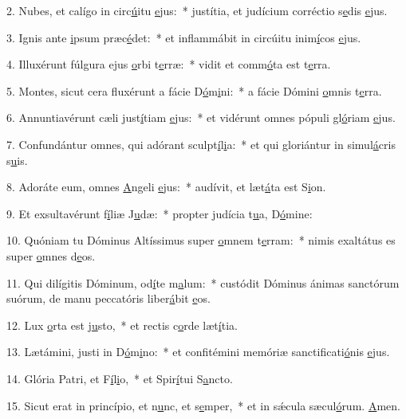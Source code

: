 2. Nubes, et calígo in circ\uline{ú}itu \uline{e}jus:~* justítia, et judícium corréctio s\uline{e}dis \uline{e}jus.\par 
3. Ignis ante \uline{i}psum præc\uline{é}det:~* et inflammábit in circúitu inim\uline{í}cos \uline{e}jus.\par 
4. Illuxérunt fúlgura ejus \uline{o}rbi t\uline{e}rræ:~* vidit et comm\uline{ó}ta est t\uline{e}rra.\par 
5. Montes, sicut cera fluxérunt a fácie D\uline{ó}m\uline{i}ni:~* a fácie Dómini \uline{o}mnis t\uline{e}rra.\par 
6. Annuntiavérunt cæli just\uline{í}tiam \uline{e}jus:~* et vidérunt omnes pópuli gl\uline{ó}riam \uline{e}jus.\par 
7. Confundántur omnes, qui adórant sculpt\uline{í}l\uline{i}a:~* et qui gloriántur in simul\uline{á}cris s\uline{u}is.\par 
8. Adoráte eum, omnes \uline{A}ngeli \uline{e}jus:~* audívit, et læt\uline{á}ta est S\uline{i}on.\par 
9. Et exsultavérunt f\uline{í}liæ J\uline{u}dæ:~* propter judícia t\uline{u}a, D\uline{ó}mine:\par 
10. Quóniam tu Dóminus Altíssimus super \uline{o}mnem t\uline{e}rram:~* nimis exaltátus es super \uline{o}mnes d\uline{e}os.\par 
11. Qui dilígitis Dóminum, od\uline{í}te m\uline{a}lum:~* custódit Dóminus ánimas sanctórum suórum, de manu peccatóris liber\uline{á}bit \uline{e}os.\par 
12. Lux \uline{o}rta est j\uline{u}sto,~* et rectis c\uline{o}rde læt\uline{í}tia.\par 
13. Lætámini, justi in D\uline{ó}m\uline{i}no:~* et confitémini memóriæ sanctificati\uline{ó}nis \uline{e}jus.\par 
14. Glória Patri, et F\uline{í}l\uline{i}o,~* et Spir\uline{í}tui S\uline{a}ncto.\par 
15. Sicut erat in princípio, et n\uline{u}nc, et s\uline{e}mper,~* et in sǽcula sæcul\uline{ó}rum. \uline{A}men.\par 
